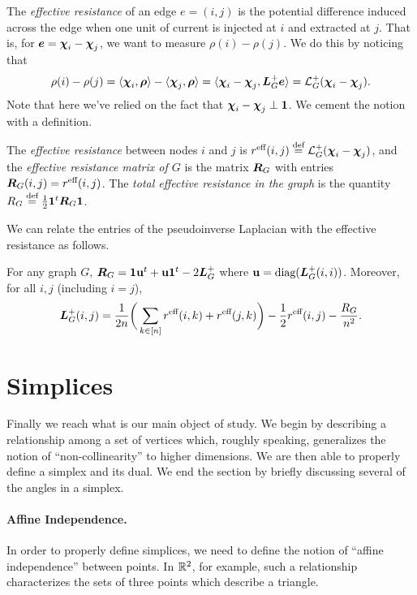The \emph{effective resistance} of an edge $e=(i,j)$ is the potential difference induced across the edge when one unit of current is injected at $i$ and extracted at $j$. That is, for $\vb*{e}=\boldsymbol{\chi}_i-\boldsymbol{\chi}_j$, we want to measure $\rho(i)-\rho(j)$. We do this by noticing that 
\[\rho(i)-\rho(j) = \langle \boldsymbol{\chi}_i,\vb*{\rho}\rangle - \langle \boldsymbol{\chi}_j,\vb*{\rho}\rangle = \langle \boldsymbol{\chi}_i-\boldsymbol{\chi}_j,\vb*{L}_G^+\vb*{e}\rangle=\mathcal{L}_G^+(\boldsymbol{\chi}_i-\boldsymbol{\chi}_j).\]
Note that here we've relied on the fact that $\boldsymbol{\chi}_i-\boldsymbol{\chi}_j\perp \vb{1}$. We cement the notion with a definition. 

\begin{definition}
	\label{def:effective_resistance}
	The \emph{effective resistance} between nodes $i$ and $j$ is $r^{\text{eff}}(i,j) \overset{\text{def}}{=} \mathcal{L}_G^+(\boldsymbol{\chi}_i-\boldsymbol{\chi}_j)$, and the \emph{effective resistance matrix of $G$} is the matrix $\vb*{R}_G$ with entries $\vb*{R}_G(i,j)=r^{\text{eff}}(i,j)$. The \emph{total effective resistance in the graph } is the quantity $R_G\overset{\text{def}}{=} \frac{1}{2}\vb{1}^t\vb*{R}_G\vb{1}$. 
\end{definition}

We can relate the entries of the pseudoinverse Laplacian with the effective resistance as follows.
\begin{lemma}
	\label{lem:er_props}
	For any graph $G$, $\vb*{R}_G = \vb{1} \vb{u} ^t + \vb{u}\vb{1}^t - 2\vb*{L}_G^+$ where $\vb{u}=\text{diag}(\vb*{L}_G^+(i,i))$. Moreover, for all $i,j$ (including $i=j$), 
	\begin{equation}
	\label{eq:L^+(i,j)}
	\vb*{L}_G^+(i,j) = \frac{1}{2n}\bigg(\sum_{k\in[n]}r^{\text{eff}}(i,k)+r^{\text{eff}}(j,k)\bigg) - \frac{1}{2}r^{\text{eff}}(i,j) -\frac{R_G}{n^2}.
	\end{equation}
\end{lemma}




\section{Simplices}
\label{sec:background_simplices}

Finally we reach what is our main object of study. We begin by describing a  relationship  among a set  of vertices which,  roughly speaking,  generalizes the notion of ``non-collinearity'' to  higher dimensions. We are then able to properly define a simplex and its dual. We end the section by briefly discussing several  of the angles in a simplex. 

\paragraph{Affine Independence.}
In order to properly define simplices, we need to define the  notion of ``affine independence'' between  points.  In $\mathbb{R}^2$, for example, such a relationship characterizes the sets of three points which describe a triangle. 


